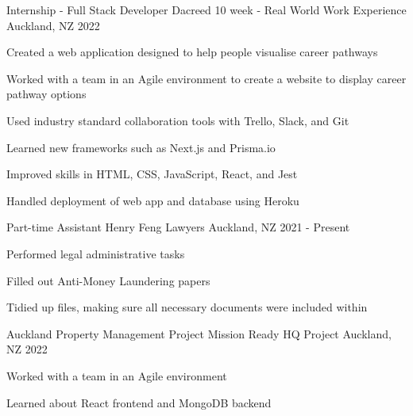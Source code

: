 

\begin{cventries}
\cventry
{Internship - Full Stack Developer} %
{Dacreed 10 week - Real World Work Experience} %
{Auckland, NZ} %
{2022} %
{
  \begin{cvitems} %
    \item {Created a web application designed to help people visualise career pathways}
    \item {Worked with a team in an Agile environment to create a website to display career pathway options}
    \item {Used industry standard collaboration tools with Trello, Slack, and Git}
    \item {Learned new frameworks such as Next.js and Prisma.io}
    \item {Improved skills in HTML, CSS, JavaScript, React, and Jest}
    \item {Handled deployment of web app and database using Heroku}
  \end{cvitems}
}

\cventry
{Part-time Assistant} %
{Henry Feng Lawyers} %
{Auckland, NZ} %
{2021 - Present} %
{
  \begin{cvitems} %
    \item {Performed legal administrative tasks}
    \item {Filled out Anti-Money Laundering papers}
    \item {Tidied up files, making sure all necessary documents were included within}
  \end{cvitems}
}

\cventry
{Auckland Property Management Project} %
{Mission Ready HQ Project} %
{Auckland, NZ} %
{2022} %
{
  \begin{cvitems} %
    \item {Worked with a team in an Agile environment}
    \item {Learned about React frontend and MongoDB backend}
  \end{cvitems}
}


\end{cventries}
